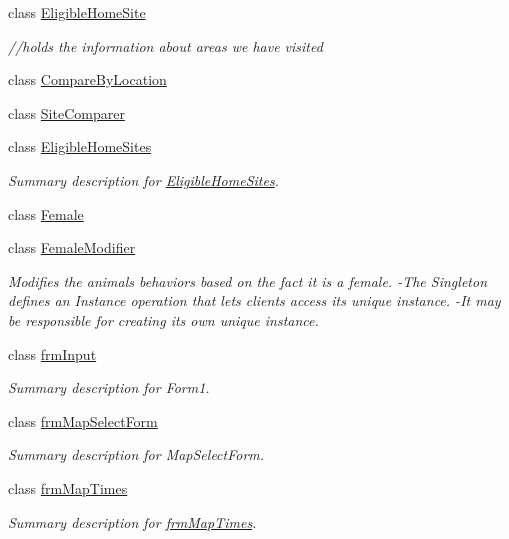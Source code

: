 \begin{DoxyCompactItemize}
class \hyperlink{class_s_e_a_r_c_h_1_1_eligible_home_site}{Eligible\-Home\-Site}
\begin{DoxyCompactList}\small\item\em //holds the information about areas we have visited \end{DoxyCompactList}\item 
class \hyperlink{class_s_e_a_r_c_h_1_1_compare_by_location}{Compare\-By\-Location}
\item 
class \hyperlink{class_s_e_a_r_c_h_1_1_site_comparer}{Site\-Comparer}
\item 
class \hyperlink{class_s_e_a_r_c_h_1_1_eligible_home_sites}{Eligible\-Home\-Sites}
\begin{DoxyCompactList}\small\item\em Summary description for \hyperlink{class_s_e_a_r_c_h_1_1_eligible_home_sites}{Eligible\-Home\-Sites}. \end{DoxyCompactList}\item 
class \hyperlink{class_s_e_a_r_c_h_1_1_female}{Female}
\item 
class \hyperlink{class_s_e_a_r_c_h_1_1_female_modifier}{Female\-Modifier}
\begin{DoxyCompactList}\small\item\em Modifies the animals behaviors based on the fact it is a female. -\/\-The Singleton defines an Instance operation that lets clients access its unique instance. -\/\-It may be responsible for creating its own unique instance. \end{DoxyCompactList}\item 
class \hyperlink{class_s_e_a_r_c_h_1_1frm_input}{frm\-Input}
\begin{DoxyCompactList}\small\item\em Summary description for Form1. \end{DoxyCompactList}\item 
class \hyperlink{class_s_e_a_r_c_h_1_1frm_map_select_form}{frm\-Map\-Select\-Form}
\begin{DoxyCompactList}\small\item\em Summary description for Map\-Select\-Form. \end{DoxyCompactList}\item 
class \hyperlink{class_s_e_a_r_c_h_1_1frm_map_times}{frm\-Map\-Times}
\begin{DoxyCompactList}\small\item\em Summary description for \hyperlink{class_s_e_a_r_c_h_1_1frm_map_times}{frm\-Map\-Times}. \end{DoxyCompactList}\item 

\end{DoxyCompactItemize}
